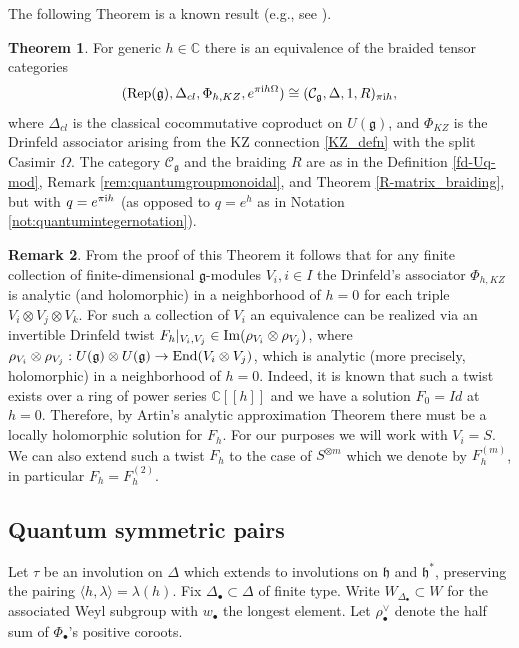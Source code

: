 \documentclass[10pt]{amsart}
\numberwithin{equation}{section}
\theoremstyle{definition}
\newtheorem{theorem}{Theorem}[section]
\newtheorem{remark}[theorem]{Remark}
\newcommand{\End}{{\rm End}}
\def\C{{\mathbb C}}
\newcommand{\ot}{\otimes}
\begin{document}
The following Theorem is a known result (e.g., see \cite[Theorem 3.1]{NeTu10}).

\begin{theorem}\label{thm:equivalencequantumclassical}
    For generic $h\in \C$ there is an equivalence of the braided tensor categories \[
    ({\rm Rep}(\mathfrak{g}), \Delta_{cl},\Phi_{h,KZ},e^{\pi {\rm i}h\Omega})\cong(\mathcal{C}_{\mathfrak{g}},\Delta, 1, R)_{\pi {\rm i} h},
    \]
    where $\Delta_{cl}$ is the classical cocommutative coproduct on $U(\mathfrak{g})$, and $\Phi_{KZ}$ is the Drinfeld associator arising from the KZ connection \eqref{KZ_defn} with the split Casimir $\Omega$. The category $\mathcal{C}_{\mathfrak{g}}$ and the braiding $R$ are as in the Definition \ref{fd-Uq-mod}, Remark \ref{rem:quantumgroupmonoidal}, and Theorem \ref{R-matrix_braiding}, but with $q=e^{\pi {\rm i}h}$ (as opposed to $q=e^{h}$ as in Notation \ref{not:quantumintegernotation}).
\end{theorem}

\begin{remark}\label{Artin's_lifting}
    From the proof of this Theorem it follows that for any finite collection of finite-dimensional $\mathfrak{g}$-modules $V_i,i\in I$ the Drinfeld's associator $\Phi_{h,KZ}$ is analytic (and holomorphic) in a neighborhood of $h=0$ for each triple $V_i \ot V_j \ot V_k$. For such a collection of $V_i$ an equivalence can be realized via an invertible Drinfeld twist $F_h|_{V_i,V_j} \in {\rm Im}(\rho_{V_i}\ot \rho_{V_j})$, where $\rho_{V_i}\ot \rho_{V_j}: U(\mathfrak{g})\ot U(\mathfrak{g}) \rightarrow \End(V_i\ot V_j)$, which is analytic (more precisely, holomorphic) in a neighborhood of $h=0$. Indeed, it is known that such a twist exists over a ring of power series $\C[[h]]$ and we have a solution $F_0=Id$ at $h=0$. Therefore, by Artin's analytic approximation Theorem there must be a locally holomorphic solution for $F_h$. For our purposes we will work with $V_i=S$. We can also extend such a twist $F_h$ to the case of $S^{\ot m}$ which we denote by $F^{(m)}_h$, in particular $F_h=F_h^{(2)}$.  
\end{remark}


\subsection{Quantum symmetric pairs}

Let $\tau$ be an involution on $\Delta$ which extends to involutions on $\mathfrak{h}$ and $\mathfrak{h}^*$, preserving the pairing $\langle h,\lambda\rangle =\lambda(h)$. Fix $\Delta_{\bullet} \subset \Delta$ of finite type. Write $W_{\Delta_{\bullet}}\subset W$ for the associated Weyl subgroup with $w_{\bullet}$ the longest element. Let $\rho_{\bullet}^{\vee}$ denote the half sum of $\Phi_{\bullet}$'s positive coroots.
\end{document}
